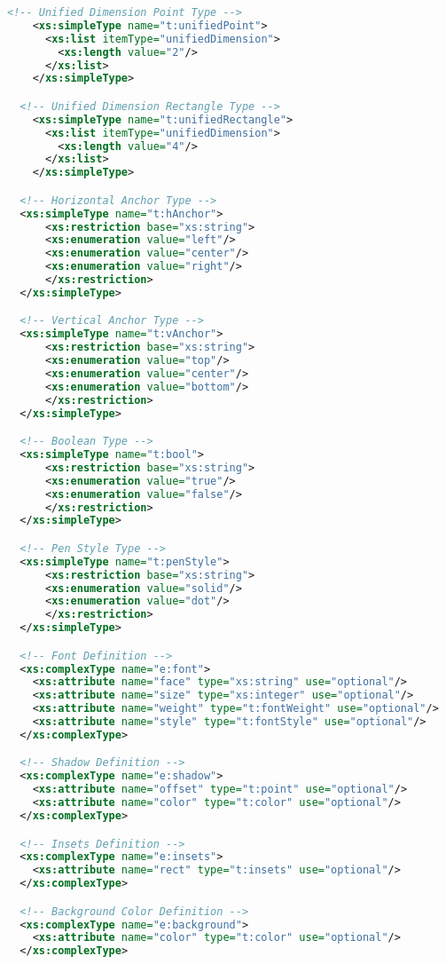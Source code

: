 \begin{lstlisting}[language=XML]
  <!-- Unified Dimension Point Type -->
    <xs:simpleType name="t:unifiedPoint">
      <xs:list itemType="unifiedDimension">
        <xs:length value="2"/>
      </xs:list>
    </xs:simpleType>

  <!-- Unified Dimension Rectangle Type -->
    <xs:simpleType name="t:unifiedRectangle">
      <xs:list itemType="unifiedDimension">
        <xs:length value="4"/>
      </xs:list>
    </xs:simpleType>

  <!-- Horizontal Anchor Type -->
  <xs:simpleType name="t:hAnchor">
      <xs:restriction base="xs:string">
      <xs:enumeration value="left"/>
      <xs:enumeration value="center"/>
      <xs:enumeration value="right"/>
      </xs:restriction>
  </xs:simpleType>

  <!-- Vertical Anchor Type -->
  <xs:simpleType name="t:vAnchor">
      <xs:restriction base="xs:string">
      <xs:enumeration value="top"/>
      <xs:enumeration value="center"/>
      <xs:enumeration value="bottom"/>
      </xs:restriction>
  </xs:simpleType>

  <!-- Boolean Type -->
  <xs:simpleType name="t:bool">
      <xs:restriction base="xs:string">
      <xs:enumeration value="true"/>
      <xs:enumeration value="false"/>
      </xs:restriction>
  </xs:simpleType>  

  <!-- Pen Style Type -->
  <xs:simpleType name="t:penStyle">
      <xs:restriction base="xs:string">
      <xs:enumeration value="solid"/>
      <xs:enumeration value="dot"/>
      </xs:restriction>
  </xs:simpleType>

  <!-- Font Definition -->
  <xs:complexType name="e:font">
    <xs:attribute name="face" type="xs:string" use="optional"/>
    <xs:attribute name="size" type="xs:integer" use="optional"/>
    <xs:attribute name="weight" type="t:fontWeight" use="optional"/>
    <xs:attribute name="style" type="t:fontStyle" use="optional"/>
  </xs:complexType>

  <!-- Shadow Definition -->
  <xs:complexType name="e:shadow">
    <xs:attribute name="offset" type="t:point" use="optional"/>
    <xs:attribute name="color" type="t:color" use="optional"/>
  </xs:complexType>

  <!-- Insets Definition -->
  <xs:complexType name="e:insets">
    <xs:attribute name="rect" type="t:insets" use="optional"/>
  </xs:complexType>

  <!-- Background Color Definition -->
  <xs:complexType name="e:background">
    <xs:attribute name="color" type="t:color" use="optional"/>
  </xs:complexType>


\end{lstlisting}
